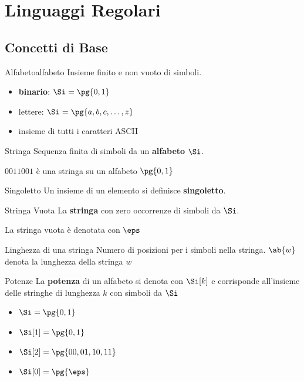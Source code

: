 \chapter{Linguaggi Regolari}\label{chap:linguaggi_regolari} %
\section{Concetti di Base}\label{sec:lr_concetti_di_base} %
\begin{definition}{Alfabeto}{alfabeto}
    Insieme finito e non vuoto di simboli.
    \begin{itemize}
        \item \textbf{binario}: $\Si = \pg{0,1}$
        \item lettere: $\Si = \pg{a,b,c,\dots,z}$
        \item insieme di tutti i caratteri ASCII
    \end{itemize}
\end{definition}
\begin{definition}{Stringa}{}
    Sequenza finita di simboli da un \textbf{alfabeto} $\Si$.
    \begin{example}{}{}
        $0011001$ è una stringa su un alfabeto $\pg{0,1}$
    \end{example}
\end{definition}
\begin{definition}{Singoletto}{}
    Un insieme di un elemento si definisce \textbf{singoletto}.
\end{definition}
\begin{definition}{Stringa Vuota}{}
    La \textbf{stringa} con zero occorrenze di simboli da $\Si$.
    \begin{note}
        La stringa vuota è denotata con $\eps$
    \end{note}
\end{definition}
\begin{definition}{Linghezza di una stringa}{}
    Numero di posizioni per i simboli nella stringa.
    $\ab{w}$ denota la lunghezza della stringa $w$
\end{definition}
\begin{definition}{Potenze}{}
    La \textbf{potenza} di un alfabeto si denota con $\Si[k]$ e corrisponde all'insieme delle stringhe di lunghezza $k$ con simboli da $\Si$
    \begin{itemize}
        \item $\Si = \pg{0,1}$
        \item $\Si[1] = \pg{0,1}$
        \item $\Si[2] = \pg{00, 01, 10, 11}$
        \item $\Si[0] = \pg{\eps}$
    \end{itemize}
\end{definition}
